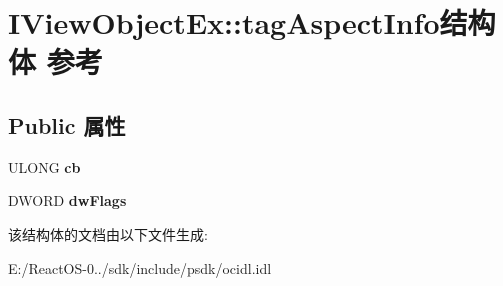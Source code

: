 \hypertarget{struct_i_view_object_ex_1_1tag_aspect_info}{}\section{I\+View\+Object\+Ex\+:\+:tag\+Aspect\+Info结构体 参考}
\label{struct_i_view_object_ex_1_1tag_aspect_info}
\subsection*{Public 属性}
\begin{DoxyCompactItemize}
\item 
\mbox{\label{struct_i_view_object_ex_1_1tag_aspect_info_a18ca0d8b520b9476677a07afcb48fa7f}} 
U\+L\+O\+NG {\bfseries cb}
\item 
\mbox{\label{struct_i_view_object_ex_1_1tag_aspect_info_acb725b40c6856dc153b79a37de398a94}} 
D\+W\+O\+RD {\bfseries dw\+Flags}
\end{DoxyCompactItemize}


该结构体的文档由以下文件生成\+:\begin{DoxyCompactItemize}
\item 
E\+:/\+React\+O\+S-\/0../sdk/include/psdk/ocidl.\+idl\end{DoxyCompactItemize}
